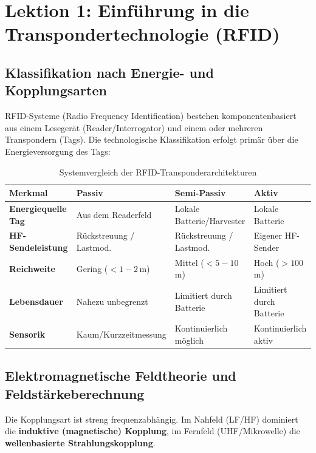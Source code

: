 \documentclass[8pt,a4paper]{article}
\begin{document}
\newpage

\section{Lektion 1: Einführung in die Transpondertechnologie (RFID)}

\subsection{Klassifikation nach Energie- und Kopplungsarten}
RFID-Systeme (Radio Frequency Identification) bestehen komponentenbasiert aus einem Lesegerät (Reader/Interrogator) und einem oder mehreren Transpondern (Tags). Die technologische Klassifikation erfolgt primär über die Energieversorgung des Tags:

\begin{table}[h!]
\centering
\caption{Systemvergleich der RFID-Transponderarchitekturen}
\begin{tabular}{llll}
\toprule
\textbf{Merkmal} & \textbf{Passiv} & \textbf{Semi-Passiv} & \textbf{Aktiv} \\
\midrule
\textbf{Energiequelle Tag} & Aus dem Readerfeld & Lokale Batterie/Harvester & Lokale Batterie \\
\textbf{HF-Sendeleistung} & Rückstreuung / Lastmod. & Rückstreuung / Lastmod. & Eigener HF-Sender \\
\textbf{Reichweite} & Gering ($< 1-2$\,m) & Mittel ($< 5-10$\,m) & Hoch ($> 100$\,m) \\
\textbf{Lebensdauer} & Nahezu unbegrenzt & Limitiert durch Batterie & Limitiert durch Batterie \\
\textbf{Sensorik} & Kaum/Kurzzeitmessung & Kontinuierlich möglich & Kontinuierlich aktiv \\
\bottomrule
\end{tabular}
\end{table}

\subsection{Elektromagnetische Feldtheorie und Feldstärkeberechnung}
Die Kopplungsart ist streng frequenzabhängig. Im Nahfeld (LF/HF) dominiert die \textbf{induktive (magnetische) Kopplung}, im Fernfeld (UHF/Mikrowelle) die \textbf{wellenbasierte Strahlungskopplung}.
\end{document}
